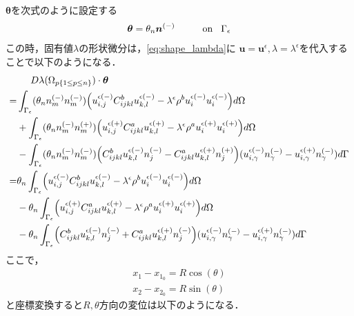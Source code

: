 $\bm{\theta}$を次式のように設定する
\begin{align}
	\bm{\theta}=\theta_{n}\bm{n}^{(-)}\hspace{1cm}\text{on}\hspace{0.3cm}\Gamma_{\epsilon}
\end{align}
この時，固有値$\lambda$の形状微分は，\eqref{eq:shape_lambda}に
$\bm{u}=\bm{u}^{\epsilon},\lambda=\lambda^{\epsilon}$を代入することで以下のようになる．
\begin{align}
	&\hspace{0.5cm}D\lambda(\Omega_{p\{1\leq p\leq n\}})\cdot\bm{\theta}
	\nonumber
	\\
	=&\int_{\Gamma_\epsilon}(\theta_{n}n_{m}^{(-)}n_{m}^{(-)})
	\Bigr(u_{i,j}^{\epsilon(-)}C_{ijkl}^{b}u_{k,l}^{\epsilon(-)}
	-\lambda^{\epsilon}\rho^{b}u_{i}^{\epsilon(-)}u_{i}^{\epsilon(-)}\Bigl) d\Omega
	\nonumber
	\\
	&+\int_{\Gamma_\epsilon}(\theta_{n}n_{m}^{(-)}n_{m}^{(+)})
	\Bigr(u_{i,j}^{\epsilon(+)}C_{ijkl}^{a}u_{k,l}^{\epsilon(+)}
	-\lambda^{\epsilon}\rho^{a}u_{i}^{\epsilon(+)}u_{i}^{\epsilon(+)}\Bigl) d\Omega
	\nonumber
	\\
	&-\int_{\Gamma_{\epsilon}}(\theta_{n}n_{m}^{(-)}n_{m}^{(-)})
	\Bigr(C_{ijkl}^{b}u_{k,l}^{\epsilon(-)}n_{j}^{(-)}
	-C_{ijkl}^{a}u_{k,l}^{\epsilon(+)}n_{j}^{(+)}\Bigl)
	(u_{i,\gamma}^{\epsilon(-)}n_\gamma^{(-)}-u_{i,\gamma}^{\epsilon(+)}n_\gamma^{(-)}) d\Gamma
	\nonumber
	\\
	=&\theta_{n}\int_{\Gamma_\epsilon}
	\Bigr(u_{i,j}^{\epsilon(-)}C_{ijkl}^{b}u_{k,l}^{\epsilon(-)}
	-\lambda^{\epsilon}\rho^{b}u_{i}^{\epsilon(-)}u_{i}^{\epsilon(-)}\Bigl) d\Omega
	\nonumber
	\\
	&-\theta_{n}\int_{\Gamma_\epsilon}
	\Bigr(u_{i,j}^{\epsilon(+)}C_{ijkl}^{a}u_{k,l}^{\epsilon(+)}
	-\lambda^{\epsilon}\rho^{a}u_{i}^{\epsilon(+)}u_{i}^{\epsilon(+)}\Bigl) d\Omega
	\nonumber
	\\
	&-\theta_{n}\int_{\Gamma_{\epsilon}}
	\Bigr(C_{ijkl}^{b}u_{k,l}^{\epsilon(-)}n_{j}^{(-)}
	+C_{ijkl}^{a}u_{k,l}^{\epsilon(+)}n_{j}^{(-)}\Bigl)
	(u_{i,\gamma}^{\epsilon(-)}n_\gamma^{(-)}-u_{i,\gamma}^{\epsilon(+)}n_\gamma^{(-)}) d\Gamma
	\label{eq:SDForTD}
\end{align}
ここで，
\begin{align}
	x_{1}-x_{1_{0}}=R\cos(\theta)
	\nonumber
	\\
	x_{2}-x_{2_{0}}=R\sin(\theta)
	\label{eq:xyToRTh}
\end{align}
と座標変換すると$R,\theta$方向の変位は以下のようになる．
